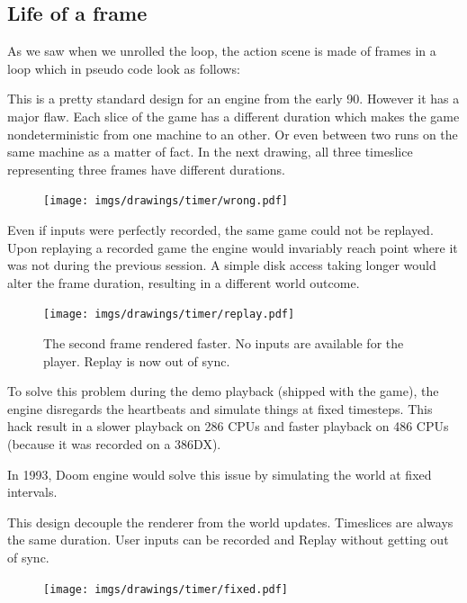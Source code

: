 \subsection{Life of a frame}
As we saw when we unrolled the loop, the action scene is made of frames in a loop which in pseudo code look as follows:\\
\par
\begin{minipage}{\textwidth}
 
 \end{minipage}
\par
This is a pretty standard design for an engine from the early 90. However it has a major flaw. Each slice of the game has a different duration which makes the game nondeterministic from one machine to an other. Or even between two runs on the same machine as a matter of fact. In the next drawing, all three timeslice representing three frames have different durations.\\
\begin{figure}[H]
\centering
 \texttt{[image: imgs/drawings/timer/wrong.pdf]}
 
 \end{figure}
  Even if inputs were perfectly recorded, the same game could not be replayed. Upon replaying a recorded game the engine would invariably reach point where it was not during the previous session. A simple disk access taking longer would alter the frame duration, resulting in a different world outcome.\\
 \begin{figure}[H]
\centering
 \texttt{[image: imgs/drawings/timer/replay.pdf]}
 \caption{The second frame rendered faster. No inputs are available for the player. Replay is now out of sync.}
 \end{figure}
\par
To solve this problem during the demo playback (shipped with the game), the engine disregards the heartbeats and simulate things at fixed timesteps. This hack result in a slower playback on 286 CPUs and faster playback on 486 CPUs (because it was recorded on a 386DX).\\
\par
{} In 1993, Doom engine would solve this issue by simulating the world at fixed intervals.\\
\par
\begin{minipage}{\textwidth}
 
 \end{minipage}
\par
This design decouple the renderer from the world updates. Timeslices are always the same duration. User inputs can be recorded and Replay without getting out of sync.
\par
 \begin{figure}[H]
\centering
 \texttt{[image: imgs/drawings/timer/fixed.pdf]}
 
 \end{figure}

